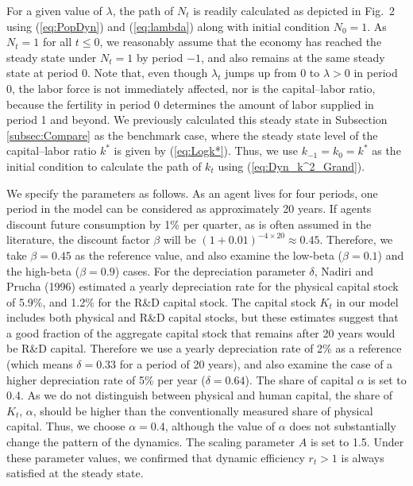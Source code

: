 \documentclass{MBE}%
\begin{document}
{For a given value of $\lambda$, the path of $N_{t}$ is readily calculated as depicted in Fig.~2
using (\ref{eq:PopDyn}) and (\ref{eq:lambda}) along with initial condition $N_{0}=1$. As $N_{t}=1$
for all $t\leq0$, we reasonably assume that the economy has reached the steady state under
$N_{t}=1$ by period $-1$, and also remains at the same steady state at period 0. {Note that, even
though $\lambda_{t}$ jumps up from 0 to $\lambda>0$ in period 0, the labor force is not
immediately affected, nor is the capital--labor ratio, because the fertility in period 0
determines the amount of labor supplied in period 1 and beyond.} We previously calculated this
steady state in Subsection \ref{subsec:Compare} as the benchmark case, where the steady state
level of the capital--labor ratio $k^{\ast}$ is given by (\ref{eq:Logk*}). Thus, we use
$k_{-1}=k_{0}=k^{\ast}$ as the initial condition to calculate the path of $k_{t}$ using
(\ref{eq:Dyn_k^2_Grand}).

We specify the parameters as follows. As an agent lives for four periods, one period in the model
can be considered as approximately 20 years. If agents discount future consumption by 1\% per
quarter, as is often assumed in the literature, the discount factor $\beta$ will be $(1+0.01)^{-4
\times20} \approx0.45$. Therefore, we take $\beta=0.45$ as the reference value, and also examine
the low-beta ($\beta=0.1$) and the high-beta ($\beta=0.9$) cases. For the depreciation parameter
$\delta$, Nadiri and Prucha (1996) estimated a yearly depreciation rate for the physical capital
stock of 5.9\%, and 1.2\% for the R\&D capital stock. The capital stock $K_{t}$ in our model
includes both physical and R\&D capital stocks, but these estimates suggest that a good fraction
of the aggregate capital stock that remains after 20 years would be R\&D capital. Therefore we use
a yearly depreciation rate of 2\% as a reference (which means $\delta=0.33$ for a period of 20
years), and also examine the case of a higher depreciation rate of 5\% per year ($\delta =0.64$).
The share of capital $\alpha$ is set to 0.4. {As we do not distinguish between physical and human
capital, the share of $K_{t}$, $\alpha $, should be higher than the conventionally measured share
of physical capital. Thus, we choose $\alpha=0.4$, although the value of $\alpha$ does not
substantially change the pattern of the dynamics. The scaling parameter $A$ is set to 1.5. Under
these parameter values, we confirmed that dynamic efficiency $r_{t}>1$ is always satisfied at the
steady state.}

}
\end{document}
